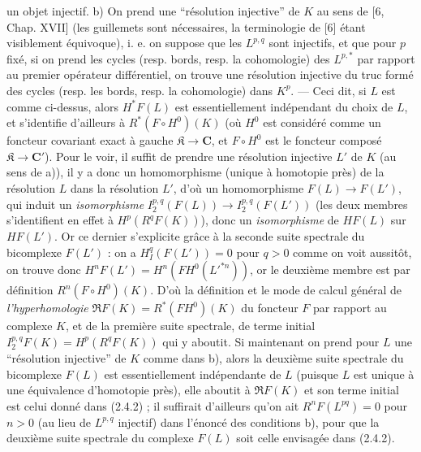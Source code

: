 
\noindent un objet injectif.
b) On prend une ``résolution injective'' de $K$ au sens de [6, Chap. XVII]
(les guillemets sont nécessaires, la terminologie de [6] étant visiblement
équivoque), i. e. on suppose que les $L^{p,q}$ sont injectifs, et que pour $p$
fixé, si on prend les cycles (resp. bords, resp. la cohomologie) des $L^{p,*}$
par rapport au premier opérateur différentiel, on trouve une résolution
injective du truc formé des cycles (resp. les bords, resp. la cohomologie) dans
$K^p$.
--- Ceci dit, si $L$ est comme ci-dessus, alors $H^*F(L)$ est essentiellement
indépendant du choix de $L$, et s'identifie d'ailleurs à
$R^*(F\mathbin{\circ}H^0)(K)$ (où $H^0$ est considéré comme un foncteur
covariant exact à gauche $\mathfrak K\to \mathbf{C}$, et
$F\mathbin{\circ}H^0$ est le foncteur composé
$\mathfrak K\to \mathbf{C}'$). Pour le voir, il suffit de prendre une
résolution injective $L'$ de $K$ (au sens de a)), il y a donc un homomorphisme
(unique à homotopie près) de la résolution $L$ dans la résolution $L'$, d'où
un homomorphisme $F(L)\to F(L')$, qui induit un \textit{isomorphisme}
$I_2^{p,q}(F(L))\to
I_2^{p,q}(F(L'))$
(les deux membres s'identifient en effet à $H^p(R^qF(K))$), donc un
\textit{isomorphisme} de $HF(L)$ sur $HF(L')$. Or ce dernier s'explicite grâce
à la seconde suite spectrale du bicomplexe $F(L')$ : on a
$H_{I}^q(F(L'))=0$ pour $q>0$ comme on voit aussitôt, on trouve donc
$H^nF(L')=H^n(FH^0(L'^{*n}))$,
or le deuxième membre est par définition $R^n(F\mathbin{\circ}H^0)(K)$.
D'où la définition et le mode de calcul général de \textit{l'hyperhomologie}
$\mathfrak R F(K)=R^*(FH^0)(K)$ du foncteur $F$ par rapport au
complexe $K$, et de la première suite spectrale, de terme initial
$I_2^{p,q}F(K)=H^p(R^qF(K))$ qui y aboutit.
Si maintenant on prend pour $L$ une ``résolution injective'' de $K$ comme dans
b), alors la deuxième suite spectrale du bicomplexe $F(L)$ est essentiellement
indépendante de $L$ (puisque $L$ est unique à une équivalence d'homotopie
près), elle aboutit à $\mathfrak R F(K)$ et son terme initial est celui donné
dans (2.4.2) ; il suffirait d'ailleurs qu'on ait $R^nF(L^{pq})=0$ pour $n>0$
(au lieu de $L^{p,q}$ injectif) dans l'énoncé des conditions b), pour que la
deuxième suite spectrale du complexe $F(L)$ soit celle envisagée dans (2.4.2).
